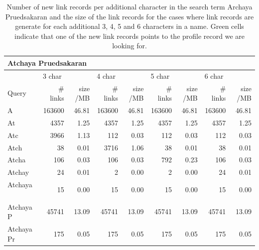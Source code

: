 \begin{table}[!htb]
\caption{Number of new link records per additional character in the search term Archaya Pruedsakaran and the size of the link records for the cases where link records are generate for each additional 3, 4, 5 and 6 characters in a name. Green cells indicate that one of the new link records points to the profile record we are looking for.}
\begin{center}
\scriptsize{
  \begin{tabular}{ | l | r | r | r | r | r | r | r | r | }
    \hline                       
    \multicolumn{9}{|l|}{\textbf{Atchaya Pruedsakaran}} \\ 
    \hline                       
    \hline  
    & \multicolumn{2}{l|}{3 char} & \multicolumn{2}{l|}{4 char} & \multicolumn{2}{l|}{5 char} & \multicolumn{2}{l|}{6 char}  \\
    Query & \# links & size /MB & \# links & size /MB & \# links & size /MB & \# links & size /MB  \\
    \hline  
    A                         & 163600 & 46.81 & 163600 & 46.81 & 163600 & 46.81 & 163600 & 46.81 \\
    \hline                   
    At                        & 4357 & 1.25 & 4357 & 1.25 & 4357 & 1.25 & 4357 & 1.25 \\
    \hline                   
    Atc                       & \cellcolor{green} 3966 & 1.13 & 112 & 0.03 & 112 & 0.03 & 112 & 0.03 \\
    \hline                   
    Atch                      & 38 & 0.01 & \cellcolor{green} 3716 & 1.06 & 38 & 0.01 & 38 & 0.01 \\
    \hline                   
    Atcha                     & 106 & 0.03 & 106 & 0.03 & \cellcolor{green} 792 & 0.23 & 106 & 0.03 \\
    \hline                   
    Atchay                    & \cellcolor{green} 24 & 0.01 & 2 & 0.00 & 2 & 0.00 & \cellcolor{green} 24 & 0.01 \\
    \hline                   
    Atchaya                   & \cellcolor{green} 15 & 0.00 & \cellcolor{green} 15 & 0.00 & \cellcolor{green} 15 & 0.00 & \cellcolor{green} 15 & 0.00 \\
    \hline                   
    Atchaya P                 & 45741 & 13.09 & 45741 & 13.09 & 45741 & 13.09 & 45741 & 13.09 \\
    \hline                   
    Atchaya Pr                & 175 & 0.05 & 175 & 0.05 & 175 & 0.05 & 175 & 0.05 \\

\end{tabular}}
\end{center}
\end{table}
